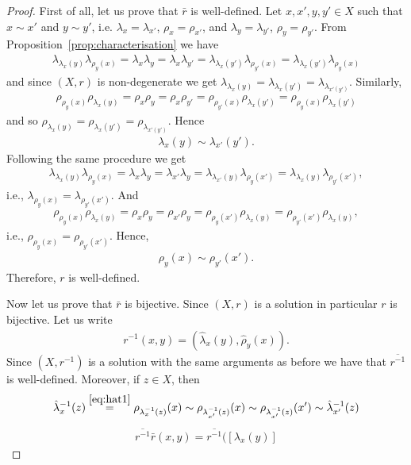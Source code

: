 \begin{proof}
    First of all, let us prove that $\bar{r}$ is well-defined.
    Let $x,x',y,y'\in X$ such that $x\sim x'$ and $y\sim y'$, i.e. $\lambda_x=\lambda_{x'}$, $\rho_x=\rho_{x'}$, and $\lambda_y=\lambda_{y'}$, $\rho_y=\rho_{y'}$.
    From Proposition~\ref{prop:characterisation} we have 
    \begin{align*}
        \lambda_{\lambda_x(y)}\lambda_{\rho_y(x)}=\lambda_x\lambda_y=\lambda_x\lambda_{y'}
        =\lambda_{\lambda_x(y')}\lambda_{\rho_{y'}(x)} = \lambda_{\lambda_x(y')}\lambda_{\rho_y(x)}
    \end{align*}
    and since $(X,r)$ is non-degenerate we get $\lambda_{\lambda_x(y)}=\lambda_{\lambda_x(y')}=\lambda_{\lambda_{{x'}(y')}}$.
    Similarly,
    \begin{align*}
        \rho_{\rho_y(x)}\rho_{\lambda_x(y)}=\rho_x\rho_y=\rho_x\rho_{y'}
        =\rho_{\rho_{y'}(x)}\rho_{\lambda_x(y')} = \rho_{\rho_y(x)}\rho_{\lambda_x(y')}
    \end{align*}
    and so 
    $\rho_{\lambda_x(y)}=\rho_{\lambda_x(y')}=\rho_{\lambda_{{x'}(y')}}$. Hence
    \begin{align*}
        \lambda_x(y)\sim\lambda_{x'}(y').
    \end{align*}
    Following the same procedure we get
    \begin{align*}
        \lambda_{\lambda_x(y)}\lambda_{\rho_y(x)}=\lambda_x\lambda_y=\lambda_{x'}\lambda_{y}
        =\lambda_{\lambda_{x'}(y)}\lambda_{\rho_{y}(x')} = \lambda_{\lambda_x(y)}\lambda_{\rho_{y'}(x')},
    \end{align*}
    i.e., $\lambda_{\rho_y(x)}=\lambda_{\rho_{y'}(x')}$. And 
    \begin{align*}
        \rho_{\rho_y(x)}\rho_{\lambda_x(y)}=\rho_x\rho_y=\rho_{x'}\rho_{y}
        =\rho_{\rho_{y}(x')}\rho_{\lambda_x(y)} = \rho_{\rho_{y'}(x')}\rho_{\lambda_x(y)},
    \end{align*}
    i.e., $\rho_{\rho_y(x)} = \rho_{\rho_{y'}(x')}$.
    Hence,
    \begin{align*}
        \rho_y(x) \sim \rho_{y'}(x').
    \end{align*}
    Therefore, $r$ is well-defined.

    Now let us prove that $\bar{r}$ is bijective. Since $(X,r)$ is a solution in particular $r$ is bijective. Let us write
    \begin{align*}
        r^{-1}(x,y) = (\hat{\lambda}_x(y),\hat{\rho}_y(x)).
    \end{align*}
    Since $(X,r^{-1})$ is a solution with the same arguments as before we have that $\overline{r^{-1}}$ is well-defined. Moreover, if $z\in X$, then
    \begin{align*}
        \hat{\lambda}^{-1}_x(z) \overset{\eqref{eq:hat1}}{=}\rho_{\lambda^{-1}_x(z)}(x)\sim \rho_{\lambda^{-1}_{x'}(z)}(x)\sim \rho_{\lambda^{-1}_{x'}(z)}(x') \sim \hat{\lambda}^{-1}_{x'}(z)
    \end{align*}
    \begin{align*}
        \overline{r^{-1}}\bar{r}(x,y) =\overline{r^{-1}}([\lambda_x(y)]
    \end{align*}
\end{proof}



